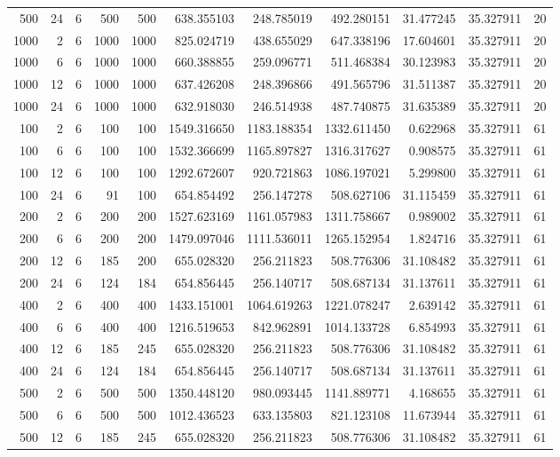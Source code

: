 \begin{table}
\begin{tabular}{rrrrrrrrrrr}
500 & 24 & 6 & 500 & 500 & 638.355103 & 248.785019 & 492.280151 & 31.477245 & 35.327911 & 20 \\
1000 & 2 & 6 & 1000 & 1000 & 825.024719 & 438.655029 & 647.338196 & 17.604601 & 35.327911 & 20 \\
1000 & 6 & 6 & 1000 & 1000 & 660.388855 & 259.096771 & 511.468384 & 30.123983 & 35.327911 & 20 \\
1000 & 12 & 6 & 1000 & 1000 & 637.426208 & 248.396866 & 491.565796 & 31.511387 & 35.327911 & 20 \\
1000 & 24 & 6 & 1000 & 1000 & 632.918030 & 246.514938 & 487.740875 & 31.635389 & 35.327911 & 20 \\
100 & 2 & 6 & 100 & 100 & 1549.316650 & 1183.188354 & 1332.611450 & 0.622968 & 35.327911 & 61 \\
100 & 6 & 6 & 100 & 100 & 1532.366699 & 1165.897827 & 1316.317627 & 0.908575 & 35.327911 & 61 \\
100 & 12 & 6 & 100 & 100 & 1292.672607 & 920.721863 & 1086.197021 & 5.299800 & 35.327911 & 61 \\
100 & 24 & 6 & 91 & 100 & 654.854492 & 256.147278 & 508.627106 & 31.115459 & 35.327911 & 61 \\
200 & 2 & 6 & 200 & 200 & 1527.623169 & 1161.057983 & 1311.758667 & 0.989002 & 35.327911 & 61 \\
200 & 6 & 6 & 200 & 200 & 1479.097046 & 1111.536011 & 1265.152954 & 1.824716 & 35.327911 & 61 \\
200 & 12 & 6 & 185 & 200 & 655.028320 & 256.211823 & 508.776306 & 31.108482 & 35.327911 & 61 \\
200 & 24 & 6 & 124 & 184 & 654.856445 & 256.140717 & 508.687134 & 31.137611 & 35.327911 & 61 \\
400 & 2 & 6 & 400 & 400 & 1433.151001 & 1064.619263 & 1221.078247 & 2.639142 & 35.327911 & 61 \\
400 & 6 & 6 & 400 & 400 & 1216.519653 & 842.962891 & 1014.133728 & 6.854993 & 35.327911 & 61 \\
400 & 12 & 6 & 185 & 245 & 655.028320 & 256.211823 & 508.776306 & 31.108482 & 35.327911 & 61 \\
400 & 24 & 6 & 124 & 184 & 654.856445 & 256.140717 & 508.687134 & 31.137611 & 35.327911 & 61 \\
500 & 2 & 6 & 500 & 500 & 1350.448120 & 980.093445 & 1141.889771 & 4.168655 & 35.327911 & 61 \\
500 & 6 & 6 & 500 & 500 & 1012.436523 & 633.135803 & 821.123108 & 11.673944 & 35.327911 & 61 \\
500 & 12 & 6 & 185 & 245 & 655.028320 & 256.211823 & 508.776306 & 31.108482 & 35.327911 & 61 \\

\end{tabular}
\end{table}
